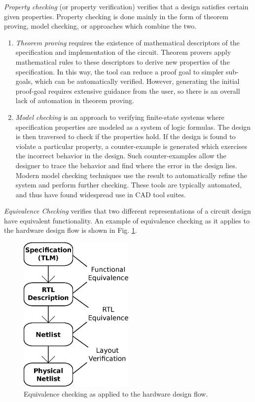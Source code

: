 {\it Property checking} (or property verification) verifies
that a design satisfies certain given properties. Property checking is done mainly 
in the form of theorem proving, model checking, or approaches which 
combine the two.
\begin{enumerate}
\item \emph{Theorem proving} \cite{theoremproving:91} requires the existence of
mathematical descriptors of the specification and implementation of the 
circuit. Theorem provers apply mathematical rules to these descriptors to
derive new properties of the specification. In this way, the tool can reduce
a proof goal to simpler sub-goals, which can be automatically verified.
However, generating the initial proof-goal requires extensive guidance from
the user, so there is an overall lack of automation in theorem 
proving.
\item \emph{Model checking} \cite{modelcheck:99} is an approach
to verifying finite-state systems where specification 
properties are modeled as a system of 
logic formulas. The design is then traversed to check if the 
properties hold. If the design is found to violate a
particular property, a counter-example is generated which exercises the
incorrect behavior in the design. Such counter-examples allow the designer
to trace the behavior and find where the error in the design lies.
Modern model checking techniques use the result to automatically refine
the system and perform further checking.
These tools are typically automated, and thus have found widespread 
use in CAD tool suites.
\end{enumerate}

{\it Equivalence Checking} verifies that two different representations of
a circuit design have equivalent functionality. An example of equivalence
checking as it applies to the hardware design flow is shown in
Fig. \ref{fig:equivflow}.

{
\begin{figure}[h]
\centerline{
\includegraphics[width=0.5\textwidth]{./figures/designVerification}
}
\caption{Equivalence checking as applied to the hardware design flow.}
\label{fig:equivflow}
\end{figure}
}

